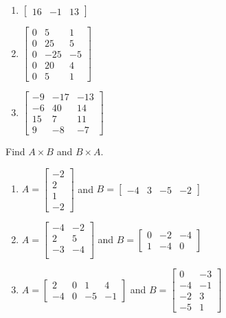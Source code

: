 \begin{Answer}[ref = mult_mat1]
\begin{enumerate}
    \item $\begin{bmatrix}
        16 & -1 & 13
    \end{bmatrix}$
    \item $\begin{bmatrix}
        0 & 5 & 1\\
        0 & 25 & 5\\
        0 & -25 & -5\\
        0 & 20 & 4\\
        0 & 5 & 1
    \end{bmatrix}$
    \item $\begin{bmatrix}
        -9 & -17 & -13\\
        -6 & 40 & 14\\
        15 & 7 & 11\\
        9 & -8 & -7
    \end{bmatrix}$
\end{enumerate}
\end{Answer}

\begin{Exercise}[title = {Multiplying Matrices 2}, label = mult_mat2]
Find $\mathbf{\mathit{A}} \times \mathbf{\mathit{B}}$ and $\mathbf{\mathit{B}} \times \mathbf{\mathit{A}}$.
\begin{enumerate}
\item $\mathbf{\mathit{A}} = \begin{bmatrix}
-2\\
2\\
1\\
-2
\end{bmatrix}$ and $\mathbf{\mathit{B}} = \begin{bmatrix}
-4 & 3 & -5 & -2
\end{bmatrix}$
\item $\mathbf{\mathit{A}} = \begin{bmatrix}
-4 & -2\\
2 & 5\\
-3 & -4\\
\end{bmatrix}$ and $\mathbf{\mathit{B}} = \begin{bmatrix}
0 & -2 & -4\\
1 & -4 & 0
\end{bmatrix}$
\item $\mathbf{\mathit{A}} = \begin{bmatrix}
2 & 0 & 1 & 4\\
-4 & 0 & -5 & -1
\end{bmatrix}$ and $\mathbf{\mathit{B}} = \begin{bmatrix}
0 & -3\\
-4 & -1\\
-2 & 3\\
-5 & 1
\end{bmatrix}$
\end{enumerate}
\end{Exercise}

